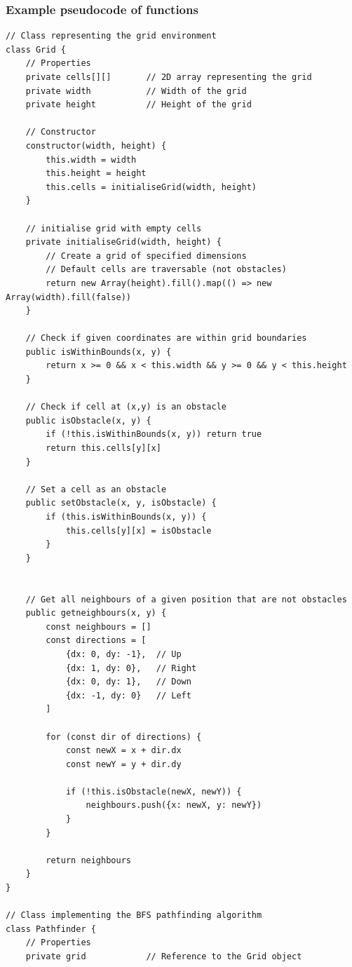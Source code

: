 \subsubsection{Example pseudocode of functions}

\begin{verbatim}
// Class representing the grid environment
class Grid {
    // Properties
    private cells[][]       // 2D array representing the grid
    private width           // Width of the grid
    private height          // Height of the grid
    
    // Constructor
    constructor(width, height) {
        this.width = width
        this.height = height
        this.cells = initialiseGrid(width, height)
    }
    
    // initialise grid with empty cells
    private initialiseGrid(width, height) {
        // Create a grid of specified dimensions
        // Default cells are traversable (not obstacles)
        return new Array(height).fill().map(() => new Array(width).fill(false))
    }
    
    // Check if given coordinates are within grid boundaries
    public isWithinBounds(x, y) {
        return x >= 0 && x < this.width && y >= 0 && y < this.height
    }
    
    // Check if cell at (x,y) is an obstacle
    public isObstacle(x, y) {
        if (!this.isWithinBounds(x, y)) return true
        return this.cells[y][x]
    }
    
    // Set a cell as an obstacle
    public setObstacle(x, y, isObstacle) {
        if (this.isWithinBounds(x, y)) {
            this.cells[y][x] = isObstacle
        }
    }

    
    // Get all neighbours of a given position that are not obstacles
    public getneighbours(x, y) {
        const neighbours = []
        const directions = [
            {dx: 0, dy: -1},  // Up
            {dx: 1, dy: 0},   // Right
            {dx: 0, dy: 1},   // Down
            {dx: -1, dy: 0}   // Left
        ]
        
        for (const dir of directions) {
            const newX = x + dir.dx
            const newY = y + dir.dy
            
            if (!this.isObstacle(newX, newY)) {
                neighbours.push({x: newX, y: newY})
            }
        }
        
        return neighbours
    }
}

// Class implementing the BFS pathfinding algorithm
class Pathfinder {
    // Properties
    private grid            // Reference to the Grid object
    

\end{verbatim}
